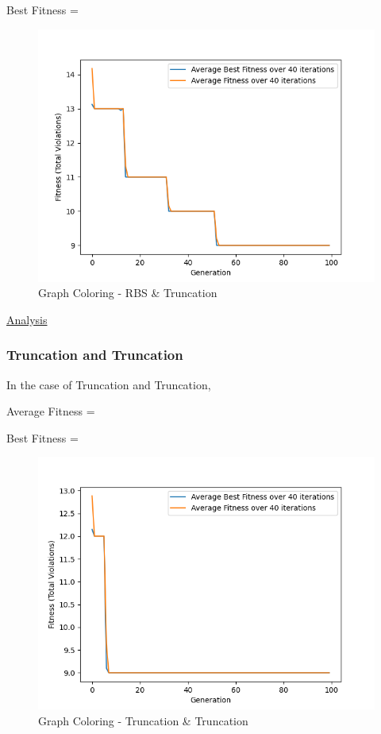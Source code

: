 \documentclass[11pt, letterpaper]{article}
\begin{document}
Best Fitness = 
\begin{figure}[h]
    \centering
    \includegraphics[scale = 0.6]{images/graphcoloring_rb_tr.png}
    \caption {Graph Coloring - RBS \& Truncation}
    \label {fig:gcBT}
\end{figure}

\underline{Analysis}

\subsubsection {Truncation and Truncation}
In the case of Truncation and Truncation,

Average Fitness = 

Best Fitness = 
\begin{figure}[H]
    \centering
    \includegraphics[scale = 0.6]{images/graphcoloring_tr_tr.png}
    \caption {Graph Coloring - Truncation \& Truncation}
    \label {fig:gcTT}
\end{figure}
\end{document}
